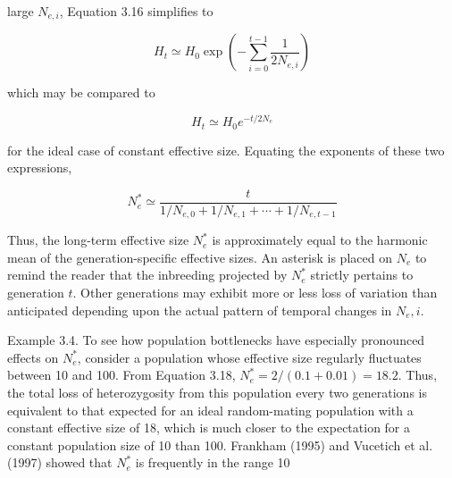 \documentclass{article}
\begin{document}
large  $ N_{e,i} $, Equation 3.16 simplifies to

\begin{equation}
H_{t}\simeq H_{0}\exp\left(-\sum_{i=0}^{t-1}\frac{1}{2N_{e,i}}\right)
\tag{3.17}
\label{eq:3_17}
\end{equation}

which may be compared to

\begin{equation}
H_{t}\simeq H_{0}e^{-t/2N_{e}}
\end{equation}

for the ideal case of constant effective size. Equating the exponents of these two expressions,

\begin{equation}
N_{e}^{*}\simeq\frac{t}{1/N_{e,0}+1/N_{e,1}+\cdots+1/N_{e,t-1}}
\tag{3.18}
\label{eq:3_18}
\end{equation}

Thus, the long-term effective size  $ N_e^* $ is approximately equal to the harmonic mean of the generation-specific effective sizes. An asterisk is placed on  $ N_e $ to remind the reader that the inbreeding projected by  $ N_e^* $ strictly pertains to generation  $ t $. Other generations may exhibit more or less loss of variation than anticipated depending upon the actual pattern of temporal changes in  $ N_e,i $.

Example 3.4. To see how population bottlenecks have especially pronounced effects on  $ N_e^* $, consider a population whose effective size regularly fluctuates between 10 and 100. From Equation 3.18,  $ N_e^* = 2/(0.1 + 0.01) = 18.2 $. Thus, the total loss of heterozygosity from this population every two generations is equivalent to that expected for an ideal random-mating population with a constant effective size of 18, which is much closer to the expectation for a constant population size of 10 than 100. Frankham (1995) and Vucetich et al. (1997) showed that  $ N_e^* $ is frequently in the range 10%
\end{document}
